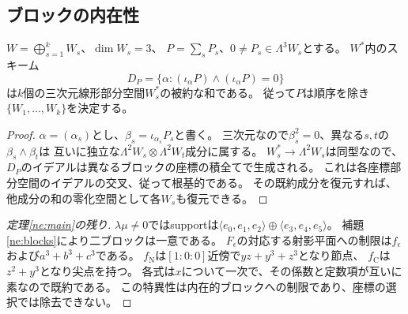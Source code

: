 \subsection{ブロックの内在性}
\begin{lemma}[縮約二形式による復元]\label{ne:blocks}
$W=\bigoplus_{s=1}^k W_s$、$\dim W_s=3$、
$P=\sum_s P_s$、$0\ne P_s\in\Lambda^3 W_s$とする。
$W^*$内のスキーム
\[
 D_P=\{\alpha:(\iota_\alpha P)\wedge(\iota_\alpha P)=0\}
\]
は$k$個の三次元線形部分空間$W_s^*$の被約な和である。
従って$P$は順序を除き$\{W_1,\ldots,W_k\}$を決定する。
\end{lemma}
\begin{proof}
$\alpha=(\alpha_s)$とし、$\beta_s=\iota_{\alpha_s}P_s$と書く。
三次元なので$\beta_s^2=0$、異なる$s,t$の$\beta_s\wedge\beta_t$は
互いに独立な$\Lambda^2W_s\otimes\Lambda^2W_t$成分に属する。
$W_s^*\to\Lambda^2W_s$は同型なので、$D_P$のイデアルは異なるブロックの座標の積全てで生成される。
これは各座標部分空間のイデアルの交叉、従って根基的である。
その既約成分を復元すれば、他成分の和の零化空間として各$W_s$も復元できる。
\end{proof}
\begin{proof}[定理\ref{ne:main}の残り]
$\lambda\mu\ne0$ではsupportは$\langle e_0,e_1,e_2\rangle\oplus\langle e_3,e_4,e_5\rangle$。
補題\ref{ne:blocks}により二ブロックは一意である。
$F_\epsilon$の対応する射影平面への制限は$f_\epsilon$および$a^3+b^3+c^3$である。
$f_{\mathrm N}$は$[1:0:0]$近傍で$yz+y^3+z^3$となり節点、
$f_{\mathrm C}$は$z^2+y^3$となり尖点を持つ。
各式は$x$について一次で、その係数と定数項が互いに素なので既約である。
この特異性は内在的ブロックへの制限であり、座標の選択では除去できない。
\end{proof}

